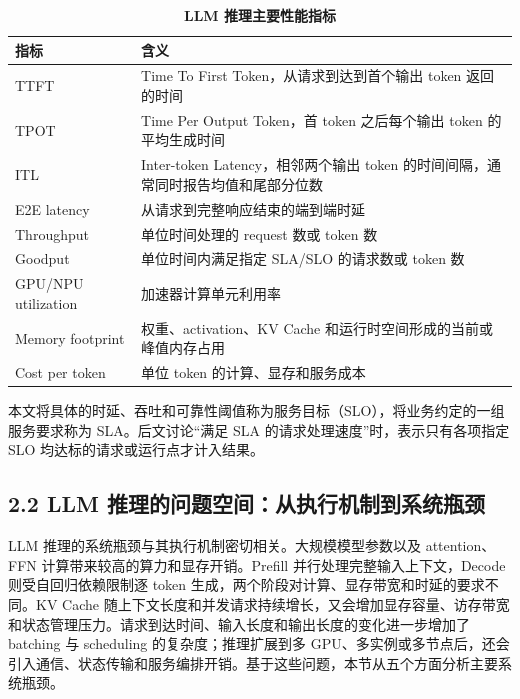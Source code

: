 \begin{table}[!htbp]
    \centering
    \caption{\textbf{LLM 推理主要性能指标}}
    \label{tab:llm-inference-metrics}
    \renewcommand{\arraystretch}{1.45}
    \scriptsize
    \setlength{\tabcolsep}{4pt}
    \begin{tabularx}{\textwidth}{@{}>{\hsize=0.55\hsize\raggedright\arraybackslash}X >{\hsize=1.45\hsize\raggedright\arraybackslash}X@{}}
        \toprule
        \textbf{指标} & \textbf{含义} \\
        \midrule
        TTFT & Time To First Token，从请求到达到首个输出 token 返回的时间 \\
        \tabrowrule
        TPOT & Time Per Output Token，首 token 之后每个输出 token 的平均生成时间 \\
        \tabrowrule
        ITL & Inter-token Latency，相邻两个输出 token 的时间间隔，通常同时报告均值和尾部分位数 \\
        \tabrowrule
        E2E latency & 从请求到完整响应结束的端到端时延 \\
        \tabrowrule
        Throughput & 单位时间处理的 request 数或 token 数 \\
        \tabrowrule
        Goodput & 单位时间内满足指定 SLA/SLO 的请求数或 token 数 \\
        \tabrowrule
        GPU/NPU utilization & 加速器计算单元利用率 \\
        \tabrowrule
        Memory footprint & 权重、activation、KV Cache 和运行时空间形成的当前或峰值内存占用 \\
        \tabrowrule
        Cost per token & 单位 token 的计算、显存和服务成本 \\
        \bottomrule
    \end{tabularx}
\end{table}

本文将具体的时延、吞吐和可靠性阈值称为服务目标（SLO），将业务约定的一组服务要求称为 SLA。后文讨论“满足 SLA 的请求处理速度”时，表示只有各项指定 SLO 均达标的请求或运行点才计入结果。




\subsection*{2.2 LLM 推理的问题空间：从执行机制到系统瓶颈}

LLM 推理的系统瓶颈与其执行机制密切相关。大规模模型参数以及 attention、FFN 计算带来较高的算力和显存开销。Prefill 并行处理完整输入上下文，Decode 则受自回归依赖限制逐 token 生成，两个阶段对计算、显存带宽和时延的要求不同。KV Cache 随上下文长度和并发请求持续增长，又会增加显存容量、访存带宽和状态管理压力。请求到达时间、输入长度和输出长度的变化进一步增加了 batching 与 scheduling 的复杂度；推理扩展到多 GPU、多实例或多节点后，还会引入通信、状态传输和服务编排开销。基于这些问题，本节从五个方面分析主要系统瓶颈。




